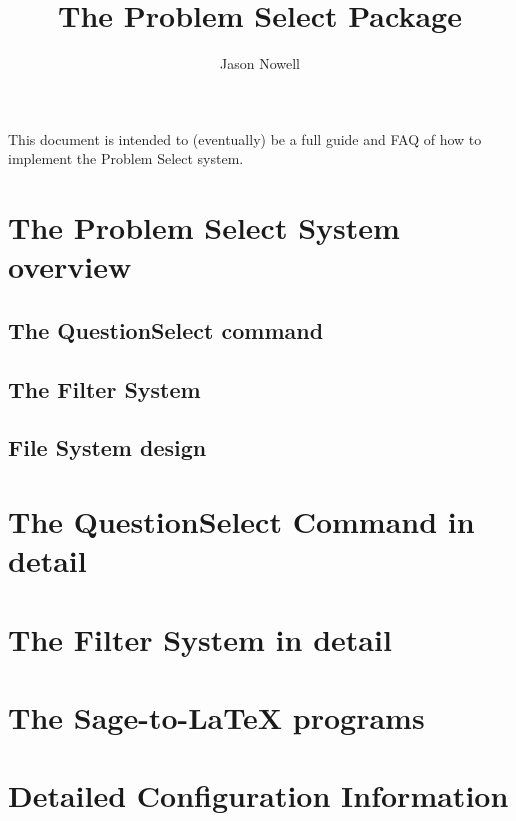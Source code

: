 \documentclass[handout]{ximera}
\title{The Problem Select Package}
\author{Jason Nowell}
\begin{document}
This document is intended to (eventually) be a full guide and FAQ of how to implement the Problem Select system.

\tableofcontents
\newpage

\section{The Problem Select System overview}

\subsection{The QuestionSelect command}

\subsection{The Filter System}

\subsection{File System design}

\section{The QuestionSelect Command in detail}

\section{The Filter System in detail}

\section{The Sage-to-LaTeX programs}

\section{Detailed Configuration Information}
\end{document}
